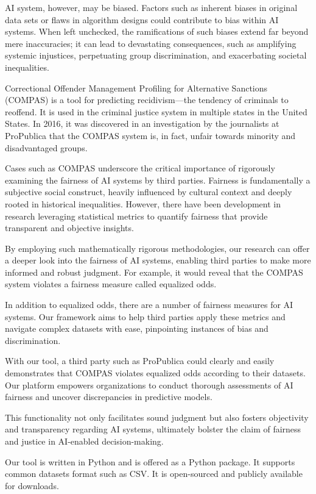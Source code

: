 \documentclass[conference]{IEEEtran}
\begin{document}
AI system, however, may be biased. Factors such as inherent biases in original data sets or flaws in algorithm designs could contribute to bias within AI systems. When left unchecked, the ramifications of such biases extend far beyond mere inaccuracies; it can lead to devastating consequences, such as amplifying systemic injustices, perpetuating group discrimination, and exacerbating societal inequalities.

Correctional Offender Management Profiling for Alternative Sanctions (COMPAS) is a tool for predicting recidivism---the tendency of criminals to reoffend. It is used in the criminal justice system in multiple states in the United States. In 2016, it was discovered in an investigation by the journalists at ProPublica that the COMPAS system is, in fact, unfair towards minority and disadvantaged groups.

Cases such as COMPAS underscore the critical importance of rigorously examining the fairness of AI systems by third parties. Fairness is fundamentally a subjective social construct, heavily influenced by cultural context and deeply rooted in historical inequalities. However, there have been development in research leveraging statistical metrics to quantify fairness that provide transparent and objective insights.

By employing such mathematically rigorous methodologies, our research can offer a deeper look into the fairness of AI systems, enabling third parties to make more informed and robust judgment. For example, it would reveal that the COMPAS system violates a fairness measure called equalized odds.

In addition to equalized odds, there are a number of fairness measures for AI systems. Our framework aims to help third parties apply these metrics and navigate complex datasets with ease, pinpointing instances of bias and discrimination.

With our tool, a third party such as ProPublica could clearly and easily demonstrates that COMPAS violates equalized odds according to their datasets. Our platform empowers organizations to conduct thorough assessments of AI fairness and uncover discrepancies in predictive models.

This functionality not only facilitates sound judgment but also fosters objectivity and transparency regarding AI systems, ultimately bolster the claim of fairness and justice in AI-enabled decision-making.

Our tool is written in Python and is offered as a Python package. It supports common datasets format such as CSV. It is open-sourced and publicly available for downloads.
\end{document}
